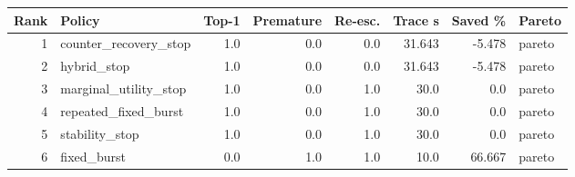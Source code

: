 \begin{tabular}{rlrrrrrl}
\hline
Rank & Policy & Top-1 & Premature & Re-esc. & Trace s & Saved \% & Pareto \\
\hline
1 & counter_recovery_stop & 1.0 & 0.0 & 0.0 & 31.643 & -5.478 & pareto \\
2 & hybrid_stop & 1.0 & 0.0 & 0.0 & 31.643 & -5.478 & pareto \\
3 & marginal_utility_stop & 1.0 & 0.0 & 1.0 & 30.0 & 0.0 & pareto \\
4 & repeated_fixed_burst & 1.0 & 0.0 & 1.0 & 30.0 & 0.0 & pareto \\
5 & stability_stop & 1.0 & 0.0 & 1.0 & 30.0 & 0.0 & pareto \\
6 & fixed_burst & 0.0 & 1.0 & 1.0 & 10.0 & 66.667 & pareto \\
\hline
\end{tabular}
